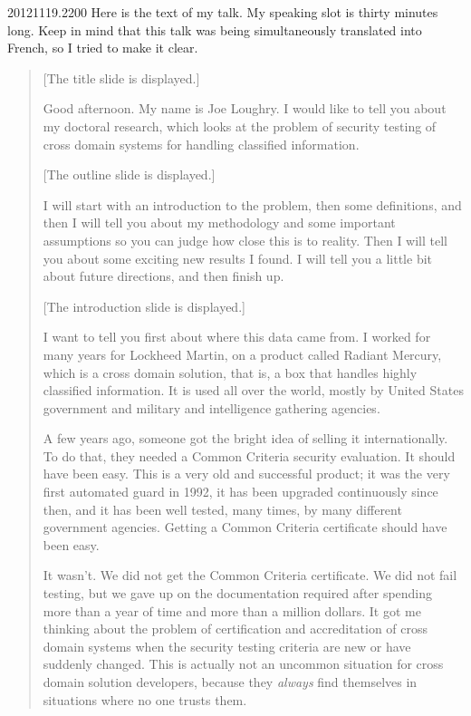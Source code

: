 \item{20121119.2200} Here is the text of my talk.  My speaking slot is thirty minutes long.  Keep
in mind that this talk was being simultaneously translated into French, so I tried to make it
clear.

\begin{quotation}

[The title slide is displayed.]

Good afternoon.  My name is Joe Loughry.  I would like to tell you about my doctoral research,
which looks at the problem of security testing of cross domain systems for handling classified
information.

[The outline slide is displayed.]

I will start with an introduction to the problem, then some definitions, and then I will tell you
about my methodology and some important assumptions so you can judge how close this is to reality.
Then I will tell you about some exciting new results I found.  I will tell you a little bit about
future directions, and then finish up.

[The introduction slide is displayed.]

I want to tell you first about where this data came from.  I worked for many years for Lockheed
Martin, on a product called Radiant Mercury, which is a cross domain solution, that is, a box that
handles highly classified information.  It is used all over the world, mostly by United States
government and military and intelligence gathering agencies.

A few years ago, someone got the bright idea of selling it internationally.  To do that, they
needed a Common Criteria security evaluation.  It should have been easy.  This is a very old and
successful product; it was the very first automated guard in 1992, it has been upgraded
continuously since then, and it has been well tested, many times, by many different government
agencies.  Getting a Common Criteria certificate should have been easy.

It wasn't.  We did not get the Common Criteria certificate.  We did not fail testing, but we gave
up on the documentation required after spending more than a year of time and more than a million
dollars.  It got me thinking about the problem of certification and accreditation of cross domain
systems when the security testing criteria are new or have suddenly changed.  This is actually not
an uncommon situation for cross domain solution developers, because they \emph{always} find
themselves in situations where no one trusts them.


\end{quotation}
